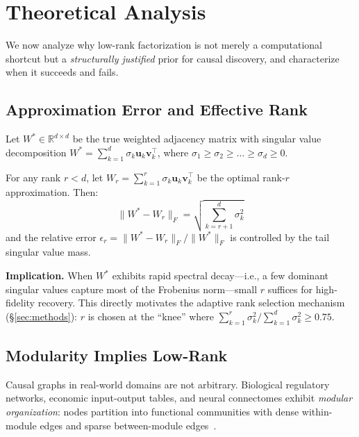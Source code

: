 \section{Theoretical Analysis}

We now analyze why low-rank factorization is not merely a computational shortcut but a \emph{structurally justified} prior for causal discovery, and characterize when it succeeds and fails.

\subsection{Approximation Error and Effective Rank}

Let $W^* \in \mathbb{R}^{d \times d}$ be the true weighted adjacency matrix with singular value decomposition $W^* = \sum_{k=1}^d \sigma_k \mathbf{u}_k \mathbf{v}_k^\top$, where $\sigma_1 \ge \sigma_2 \ge \dots \ge \sigma_d \ge 0$.

\begin{lemma}\label{lem:approximation}
For any rank $r < d$, let $W_r = \sum_{k=1}^r \sigma_k \mathbf{u}_k \mathbf{v}_k^\top$ be the optimal rank-$r$ approximation. Then:
\begin{equation}
\|W^* - W_r\|_F = \sqrt{\sum_{k=r+1}^d \sigma_k^2}
\end{equation}
and the relative error $\epsilon_r = \|W^* - W_r\|_F / \|W^*\|_F$ is controlled by the tail singular value mass.
\end{lemma}

\textbf{Implication.} When $W^*$ exhibits rapid spectral decay---i.e., a few dominant singular values capture most of the Frobenius norm---small $r$ suffices for high-fidelity recovery. This directly motivates the adaptive rank selection mechanism (\S\ref{sec:methods}): $r$ is chosen at the ``knee'' where $\sum_{k=1}^r \sigma_k^2 / \sum_{k=1}^d \sigma_k^2 \ge 0.75$.

\subsection{Modularity Implies Low-Rank}

Causal graphs in real-world domains are not arbitrary. Biological regulatory networks, economic input-output tables, and neural connectomes exhibit \emph{modular organization}: nodes partition into functional communities with dense within-module edges and sparse between-module edges~\citep{hanahan2011hallmarks,newman2006modular}.

